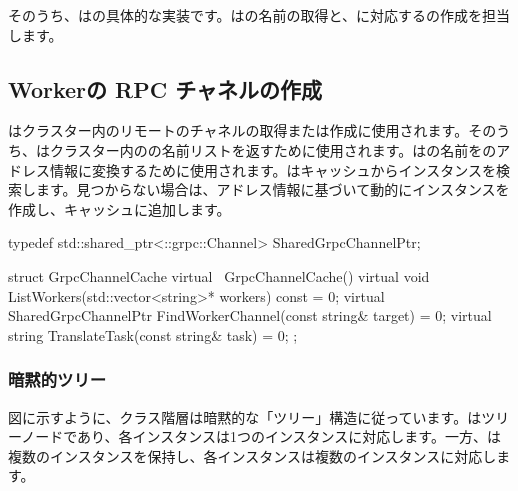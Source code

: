 \begin{content}
\begin{enum}
\end{enum}

そのうち、はの具体的な実装です。はの名前の取得と、に対応するの作成を担当します。

\subsection{Workerの RPC チャネルの作成}

はクラスター内のリモートのチャネルの取得または作成に使用されます。そのうち、はクラスター内のの名前リストを返すために使用されます。はの名前をのアドレス情報に変換するために使用されます。はキャッシュからインスタンスを検索します。見つからない場合は、アドレス情報に基づいて動的にインスタンスを作成し、キャッシュに追加します。

\begin{leftbar}
\begin{c++}
typedef std::shared_ptr<::grpc::Channel> SharedGrpcChannelPtr;

struct GrpcChannelCache {
  virtual ~GrpcChannelCache() {}
  virtual void ListWorkers(std::vector<string>* workers) const = 0;
  virtual SharedGrpcChannelPtr FindWorkerChannel(const string& target) = 0;
  virtual string TranslateTask(const string& task) = 0;
};
\end{c++}
\end{leftbar}

\subsubsection{暗黙的ツリー}

図に示すように、クラス階層は暗黙的な「ツリー」構造に従っています。はツリーノードであり、各インスタンスは1つのインスタンスに対応します。一方、は複数のインスタンスを保持し、各インスタンスは複数のインスタンスに対応します。


\end{content}
